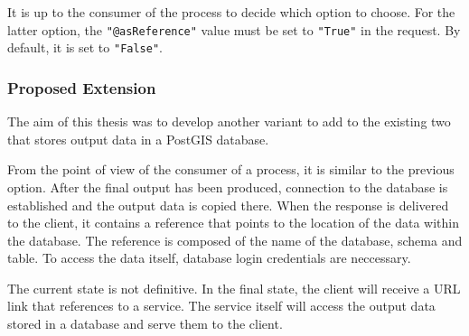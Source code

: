   It is up to the consumer of the process to decide which option to
  choose. For the latter option, the \texttt{"@asReference"} value
  must be set to \texttt{"True"} in the request. \cite{asref} By
  default, it is set to \texttt{"False"}.


\subsubsection{Proposed Extension} 

The aim of this thesis was to develop another variant to add to the
existing two that stores output data in a PostGIS database.

From the point of view of the consumer of a process, it is similar to
the previous option. After the final output has been produced,
connection to the database is established and the output data is
copied there. When the  response is delivered to the client,
it contains a reference that points to the location of the data 
within the database. The reference is composed of the name of the database, schema and table. To access the data itself, database login credentials are neccessary.

The current state is not definitive. In the final state, the client will receive a URL link that references to a  service. The  service itself will access the output data stored in a database and serve them to the client. 



